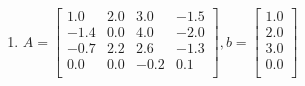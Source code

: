 \documentclass[a4paper]{article}
\begin{document}
\begin{enumerate}
\begin{enumerate}
  \item %
    $A = \begin{bmatrix}
      1.0 & 2.0 & 3.0 & -1.5\\
      -1.4 & 0.0 & 4.0 & -2.0\\
      -0.7 & 2.2 & 2.6 & -1.3\\
      0.0 & 0.0 & -0.2 & 0.1\\
      \end{bmatrix},
      b= \begin{bmatrix}
        1.0\\
        2.0\\
        3.0\\
        0.0\\
      \end{bmatrix}$


  \end{enumerate}

\end{enumerate}
\end{document}
